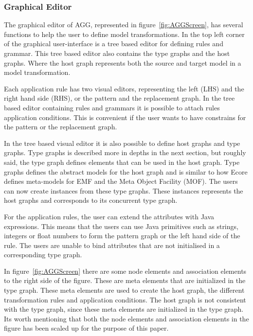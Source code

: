 \subsubsection*{Graphical Editor}
The graphical editor of AGG, represented in figure~\ref{fig:AGGScreen}, has
several functions to help the user to define model transformations. In the top
left corner of the graphical user-interface is a tree based editor for defining
rules and grammar. This tree based editor also contains the type graphs and the
host graphs. Where the host graph represents both the source and target model in
a model transformation.

Each application rule has two visual editors, representing the left
(LHS) and the right hand side (RHS), or the pattern and the replacement graph.
In the tree based editor containing rules and grammars it is possible to attach
rules application conditions. This is convenient if the user wants to have
constrains for the pattern or the replacement graph.

In the tree based visual editor it is also possible to define host
graphs and type graphs. Type graphs is described more in depths in the next
section, but roughly said, the type graph defines elements that can be used in
the host graph. Type graphs defines the abstract models for the host graph and
is similar to how Ecore defines meta-models  for EMF and the Meta Object
Facility (MOF)\cite{MOF}. The users can now create instances from these type
graphs. These instances represents the host graphs and corresponds to its
concurrent type graph.

For the application rules, the user can extend the attributes with Java
expressions. This means that the users can use Java primitives such as strings,
integers or float numbers to form the pattern graph or the left hand side of
the rule. The users are unable to bind attributes that are not initialised
in a corresponding type graph.

In figure~\ref{fig:AGGScreen} there are some node elements and association
elements to the right side of the figure. These are meta elements that are
initialized in the type graph. These meta elements are used to create the host
graph, the different transformation rules and application conditions. The host
graph is not consistent with the type graph, since these meta elements are
initialized in the type graph. Its worth mentioning that both the
node elements and association elements in the figure has been scaled up for the
purpose of this paper.

